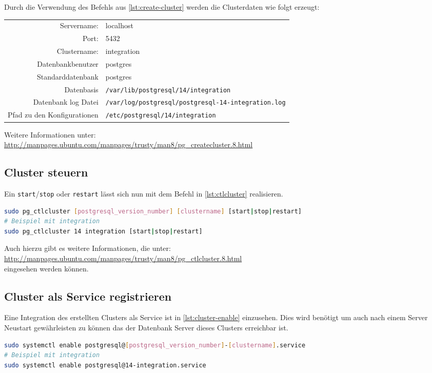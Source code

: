 Durch die Verwendung des Befehls aus \autoref{lst:create-cluster} werden die Clusterdaten wie folgt erzeugt:\\[0.5cm]
\begin{tabular}{r l}
	Servername: & localhost\\
	Port: & 5432\\
	Clustername: & integration\\
	Datenbankbenutzer & postgres\\
	Standarddatenbank & postgres\\
	Datenbasis & \lstinline[language=bash]|/var/lib/postgresql/14/integration|\\
	Datenbank log Datei & \lstinline[language=bash]|/var/log/postgresql/postgresql-14-integration.log|\\
	Pfad zu den Konfigurationen & \lstinline[language=bash]|/etc/postgresql/14/integration|\\
\end{tabular}\vspace{0.5cm}

Weitere Informationen unter:\\ \url{http://manpages.ubuntu.com/manpages/trusty/man8/pg_createcluster.8.html}\\[0.5cm]

\subsection{Cluster steuern}
Ein \lstinline[language=bash]|start|/\lstinline[language=bash]|stop| oder \lstinline[language=bash]|restart| lässt sich nun mit dem Befehl in \autoref{lst:ctlcluster} realisieren.
\begin{lstlisting}[language=bash,caption={Steuerung des Clusters},label={lst:ctlcluster}]
sudo pg_ctlcluster [postgresql_version_number] [clustername] [start|stop|restart]
# Beispiel mit integration
sudo pg_ctlcluster 14 integration [start|stop|restart]
\end{lstlisting}
Auch hierzu gibt es weitere Informationen, die unter:\\ \url{http://manpages.ubuntu.com/manpages/trusty/man8/pg_ctlcluster.8.html}\\
eingesehen werden können.\newpage

\subsection{Cluster als Service registrieren}
Eine Integration des erstellten Clusters als Service ist in \autoref{lst:cluster-enable} einzusehen. Dies wird benötigt um auch nach einem Server Neustart gewährleisten zu können das der Datenbank Server dieses Clusters erreichbar ist.
\begin{lstlisting}[language=bash,caption={Registierung des Clusters als System Service},label={lst:cluster-enable}]
sudo systemctl enable postgresql@[postgresql_version_number]-[clustername].service
# Beispiel mit integration
sudo systemctl enable postgresql@14-integration.service
\end{lstlisting}

